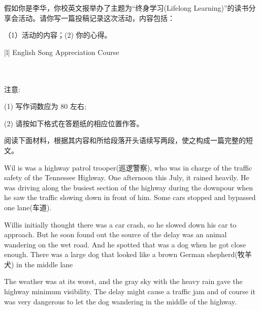 \documentclass{英语试卷}
\begin{document}
\par 假如你是李华，你校英文报举办了主题为“终身学习(Lifelong Learning)”的读书分享会活动。请你写一篇投稿记录这次活动，内容包括：\par
\par （1）活动的内容；(2) 你的心得。\par
\par\vspace{0.4em}
\begin{center}\begin{tabular}{{|l|}}
\hline
English Song Appreciation Course \\
 \\
 \\
\hline
\end{tabular}\end{center}
\vspace{0.4em}
\par 注意:\par
\par (1) 写作词数应为 80 左右;\par
\par (2) 请按如下格式在答题纸的相应位置作答。\par
{}
\par 阅读下面材料，根据其内容和所给段落开头语续写两段，使之构成一篇完整的短文。\par
\par Wil is was a highway patrol trooper(巡逻警察), who was in charge of the traffic safety of the Tennessee Highway. One afternoon this July, it rained heavily. He was driving along the busiest section of the highway during the downpour when he saw the traffic slowing down in front of him. Some cars stopped and bypassed one lane(车道).\par
\par Willis initially thought there was a car crash, so he slowed down his car to approach. But he soon found out the source of the delay was an animal wandering on the wet road. And he spotted that was a dog when he got close enough. There was a large dog that looked like a brown German shepherd(牧羊犬) in the middle lane\par
\par The weather was at its worst, and the gray sky with the heavy rain gave the highway minimum visibility. The delay might cause a traffic jam and of course it was very dangerous to let the dog wandering in the middle of the highway.\par
\end{document}
